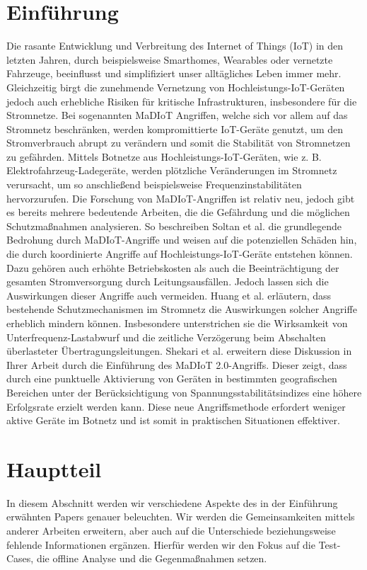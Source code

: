 \documentclass[
    a4paper,
    pagesize,
	pdftex,
    12pt,
]{scrartcl}
\begin{document}
\begin{multicols}{2}
\section{Einführung}
Die rasante Entwicklung und Verbreitung des Internet of Things (IoT) in den letzten Jahren, durch beispielsweise Smarthomes, Wearables oder vernetzte Fahrzeuge, beeinflusst und simplifiziert unser alltägliches Leben immer mehr. Gleichzeitig birgt die zunehmende Vernetzung von Hochleistungs-IoT-Geräten jedoch auch erhebliche Risiken für kritische Infrastrukturen, insbesondere für die Stromnetze. Bei sogenannten MaDIoT Angriffen, welche sich vor allem auf das Stromnetz beschränken, werden kompromittierte IoT-Geräte genutzt, um den Stromverbrauch abrupt zu verändern und somit die Stabilität von Stromnetzen zu gefährden. Mittels Botnetze aus Hochleistungs-IoT-Geräten, wie z. B. Elektrofahrzeug-Ladegeräte, werden plötzliche Veränderungen im Stromnetz verursacht, um so anschließend beispielsweise Frequenzinstabilitäten  hervorzurufen. Die Forschung von MaDIoT-Angriffen ist relativ neu, jedoch gibt es bereits mehrere bedeutende Arbeiten, die die Gefährdung und die möglichen Schutzmaßnahmen analysieren. So beschreiben Soltan et al. die grundlegende Bedrohung durch MaDIoT-Angriffe und weisen auf die potenziellen Schäden hin, die durch koordinierte Angriffe auf Hochleistungs-IoT-Geräte entstehen können. Dazu gehören auch erhöhte Betriebskosten als auch die Beeinträchtigung der gesamten Stromversorgung durch Leitungsausfällen\cite{soltan2018protecting}. Jedoch lassen sich die Auswirkungen dieser Angriffe auch vermeiden. Huang et al. erläutern, dass bestehende Schutzmechanismen im Stromnetz die Auswirkungen solcher Angriffe erheblich mindern können. \cite{huang2019protecting} Insbesondere unterstrichen sie die Wirksamkeit von Unterfrequenz-Lastabwurf und die zeitliche Verzögerung beim Abschalten überlasteter Übertragungsleitungen. Shekari et al. erweitern diese Diskussion in Ihrer Arbeit durch die Einführung des MaDIoT 2.0-Angriffs. Dieser zeigt, dass durch eine punktuelle Aktivierung von Geräten in bestimmten geografischen Bereichen unter der Berücksichtigung von Spannungsstabilitätsindizes eine höhere Erfolgsrate erzielt werden kann. Diese neue Angriffsmethode erfordert weniger aktive Geräte im Botnetz und ist somit in praktischen Situationen effektiver.
\newpage
\section{Hauptteil}
In diesem Abschnitt werden wir verschiedene Aspekte des in der Einführung erwähnten Papers genauer beleuchten. Wir werden die Gemeinsamkeiten mittels anderer Arbeiten erweitern, aber auch auf die Unterschiede beziehungsweise fehlende Informationen ergänzen. Hierfür werden wir den Fokus auf die Test-Cases, die offline Analyse und die Gegenmaßnahmen setzen.

\end{multicols}
\end{document}
